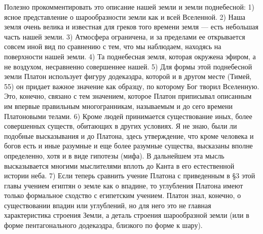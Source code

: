 Полезно прокомментировать это описание нашей земли и земли
поднебесной: 1) ясное представление о шарообразности земли как и всей
Вселенной. 2) Наша земля очень велика и известная для греков того
времени земля --- есть небольшая часть нашей земли. 3) Атмосфера
ограничена, и за пределами ее открывается совсем иной вид по сравнению
с тем, что мы наблюдаем, находясь на поверхности нашей земли. 4) Та
поднебесная земля, которая окружена эфиром, а не воздухом, несравненно
совершеннее нашей. 5) Для формы этой поднебесной земли Платон
использует фигуру додекаэдра, которой и в другом месте (Тимей, 55) он
придает важное значение как образцу, по которому Бог творил Вселенную.
Это, конечно, связано с тем значением, которое Платон приписывал
описанным им впервые правильным многогранникам, называемым и до сего
времени Платоновыми телами. 6) Кроме людей принимается существование
иных, более совершенных существ, обитающих в других условиях. Я не
знаю, были ли подобные высказывания и до Платона, здесь утверждение,
что кроме человека и богов есть и иные разумные и еще более разумные
существа, высказаны вполне определенно, хотя и в виде гипотезы (мифа).
В дальнейшем эта мысль высказывается многими мыслителями вплоть до
Канта в его естественной истории неба. 7) Если теперь сравнить учение
Платона с приведенным в §3 этой главы учением египтян о земле как о
впадине, то углубления Платона имеют только формальное сходство с
египетским учением. Платон знал, конечно, о существовании впадин или
углублений, но для него это не главная характеристика строения Земли,
а деталь строения шарообразной земли (или в форме пентагонального
додекаэдра, близкого по форме к шару).

